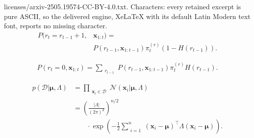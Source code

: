 \documentclass[10pt,a4paper]{amsart}
\begin{document}
licenses/arxiv-2505.19574-CC-BY-4.0.txt. Characters: every retained excerpt is pure ASCII, so the delivered engine, XeLaTeX with its default Latin Modern text font, reports no missing character.
\begin{align} \label{eq:growth-prob-def}
    P(r_t = r_{t-1}+1, &\boldsymbol{x}_{1:t}) =\\ &P(r_{t-1}, \boldsymbol{x}_{1:t-1}) \pi_t^{(r)} (1 - H(r_{t-1})). \nonumber
\end{align} 

\begin{align} \label{eq:changepoint-prob-def}
    P(r_t=0, \boldsymbol{x}_{1:t}) = \sum_{\substack{r_{t-1}}} P(r_{t-1}, \boldsymbol{x}_{1:t-1}) \pi_t^{(r)} H(r_{t-1}).
\end{align}

\begin{align} \label{eq:sampling-model}
    p(\mathcal{D} | \boldsymbol{\mu}, \Lambda) &= \prod_{\substack{\boldsymbol{x}_i \in \mathcal{D}}} \mathcal{N} (\boldsymbol{x}_i | \boldsymbol{\mu}, \Lambda)  \\&= \left( \frac{|\Lambda|}{(2 \pi)^{d}} \right)^{n/2} \nonumber \\ & \quad\quad \cdot \exp{ \left( -\frac{1}{2} \sum_{\substack{i=1}}^n (\boldsymbol{x}_i - \boldsymbol{\mu})^\top \Lambda (\boldsymbol{x}_i - \boldsymbol{\mu}) \right) \nonumber}. 
\end{align}
\end{document}
